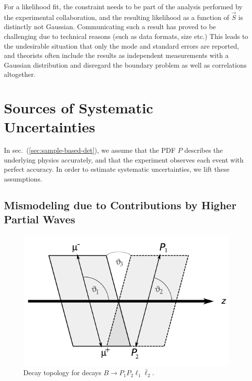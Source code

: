 \documentclass[aps,prd,reprint,nofootinbib,preprintnumbers]{revtex4}
\newcommand{\refsec}[1]{sec.~(\ref{sec:#1})}
\newcommand{\add}[1]{\textcolor{green!85!black}{#1}}
\begin{document}
\begin{enumerate}
  For a likelihood fit, the constraint needs to be part of the
  analysis performed by the experimental collaboration, and the
  resulting likelihood as a function of $\vec{S}$ is distinctly not
  Gaussian.  Communicating such a result has
  proved to be challenging due to technical reasons (such as data formats,
  size etc.) %
  This leads to the
  undesirable situation that only the mode and standard errors
  are reported, and theorists often include the results as independent
  measurements with a Gaussian distribution and disregard the boundary
  problem as well as correlations altogether.

\end{enumerate}



\section{Sources of Systematic Uncertainties}
\label{sec:systematics}

In \refsec{sample-based-det}, we assume that the PDF $P$ describes the underlying physics accurately,
and that the experiment observes each event with perfect accuracy. In order to estimate systematic
uncertainties, we lift these assumptions.

\subsection{Mismodeling due to Contributions by Higher Partial Waves}
\label{sec:systematics:partial-waves}

\begin{figure}
    \includegraphics[width=.6\textwidth]{fig-topology.pdf}
    \caption{Decay topology for decays $B\to P_1 P_2 \ell_1 \bar\ell_2$. \label{fig:topology}}
\end{figure}
\end{document}

